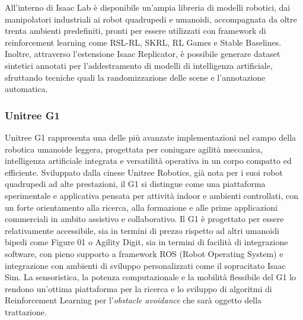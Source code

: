 All’interno di Isaac Lab è disponibile un’ampia libreria di modelli robotici, dai manipolatori industriali ai robot quadrupedi e umanoidi, accompagnata da oltre trenta ambienti predefiniti, pronti per essere utilizzati con framework di reinforcement learning come RSL-RL, SKRL, RL Games e Stable Baselines. Inoltre, attraverso l’estensione Isaac Replicator, è possibile generare dataset sintetici annotati per l’addestramento di modelli di intelligenza artificiale, sfruttando tecniche quali la randomizzazione delle scene e l’annotazione automatica.


\subsubsection{Unitree G1}
Unitree G1 rappresenta una delle più avanzate implementazioni nel campo della robotica umanoide leggera, progettata per coniugare agilità meccanica, intelligenza artificiale integrata e versatilità operativa in un corpo compatto ed efficiente. Sviluppato dalla cinese Unitree Robotics, già nota per i suoi robot quadrupedi ad alte prestazioni, il G1 si distingue come una piattaforma sperimentale e applicativa pensata per attività indoor e ambienti controllati, con un forte orientamento alla ricerca, alla formazione e alle prime applicazioni commerciali in ambito assistivo e collaborativo. Il G1 è progettato per essere relativamente accessibile, sia in termini di prezzo rispetto ad altri umanoidi bipedi come Figure 01 o Agility Digit, sia in termini di facilità di integrazione software, con pieno supporto a framework ROS (Robot Operating System) e integrazione con ambienti di sviluppo personalizzati come il sopracitato Isaac Sim. La sensoristica, la potenza computazionale e la mobilità flessibile del G1 lo rendono un'ottima piattaforma per la ricerca e lo sviluppo di algoritmi di Reinforcement Learning per l'\textit{obstacle avoidance} che sarà oggetto della trattazione.

